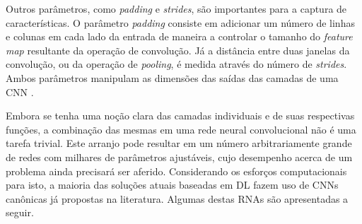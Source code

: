  Outros parâmetros, como \emph{padding} e \emph{strides}, são importantes para a captura de características. O parâmetro \emph{padding} consiste em adicionar um número de linhas e colunas em cada lado da entrada de maneira a controlar o tamanho do \emph{feature map} resultante da operação de convolução. Já a distância entre duas janelas da convolução, ou da operação de \emph{pooling}, é medida através do número de \emph{strides}. Ambos parâmetros manipulam as dimensões das saídas das camadas de uma CNN \cite{chollet2017deep}.

Embora se tenha uma noção clara das camadas individuais e de suas respectivas funções, a combinação das mesmas em uma rede neural convolucional não é uma tarefa trivial. Este arranjo pode resultar em um número arbitrariamente grande de redes com milhares de parâmetros ajustáveis, cujo desempenho acerca de um problema ainda precisará ser aferido. Considerando os esforços computacionais para isto, a maioria das soluções atuais baseadas em DL fazem uso de CNNs canônicas já propostas na literatura. Algumas destas RNAs são apresentadas a seguir.
